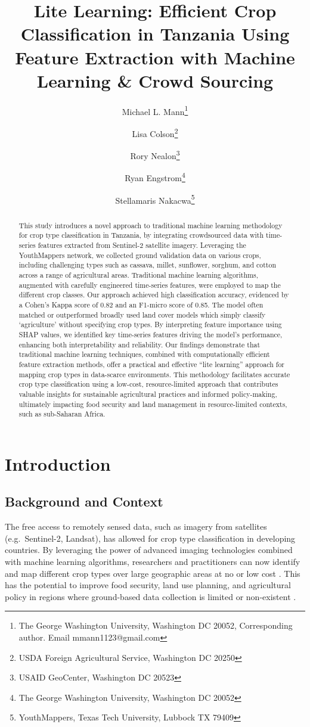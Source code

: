 \documentclass[
  journal,
  twocolumn]{IEEEtran}
\title{Lite Learning: Efficient Crop Classification in Tanzania Using
Feature Extraction with Machine Learning \& Crowd Sourcing}
\author{
Michael L. Mann\thanks{The George Washington University, Washington DC
20052, Corresponding author. Email mmann1123@gmail.com} \and 
Lisa Colson\thanks{USDA Foreign Agricultural Service, Washington DC
20250} \and 
Rory Nealon\thanks{USAID GeoCenter, Washington DC 20523} \and 
Ryan Engstrom\thanks{The George Washington University, Washington DC
20052} \and 
Stellamaris Nakacwa\thanks{YouthMappers, Texas Tech University, Lubbock
TX 79409}}
\date{}
\begin{document}
\maketitle
\begin{abstract}
This study introduces a novel approach to traditional machine learning
methodology for crop type classification in Tanzania, by integrating
crowdsourced data with time-series features extracted from Sentinel-2
satellite imagery. Leveraging the YouthMappers network, we collected
ground validation data on various crops, including challenging types
such as cassava, millet, sunflower, sorghum, and cotton across a range
of agricultural areas. Traditional machine learning algorithms,
augmented with carefully engineered time-series features, were employed
to map the different crop classes. Our approach achieved high
classification accuracy, evidenced by a Cohen's Kappa score of 0.82 and
an F1-micro score of 0.85. The model often matched or outperformed
broadly used land cover models which simply classify `agriculture'
without specifying crop types. By interpreting feature importance using
SHAP values, we identified key time-series features driving the model's
performance, enhancing both interpretability and reliability. Our
findings demonstrate that traditional machine learning techniques,
combined with computationally efficient feature extraction methods,
offer a practical and effective ``lite learning'' approach for mapping
crop types in data-scarce environments. This methodology facilitates
accurate crop type classification using a low-cost, resource-limited
approach that contributes valuable insights for sustainable agricultural
practices and informed policy-making, ultimately impacting food security
and land management in resource-limited contexts, such as sub-Saharan
Africa.
\end{abstract}

\section{Introduction}\label{introduction}

\subsection{Background and Context}\label{background-and-context}

The free access to remotely sensed data, such as imagery from satellites
(e.g.~Sentinel-2, Landsat), has allowed for crop type classification in
developing countries. By leveraging the power of advanced imaging
technologies combined with machine learning algorithms, researchers and
practitioners can now identify and map different crop types over large
geographic areas at no or low cost \citep{hersh2021open}. This has the
potential to improve food security, land use planning, and agricultural
policy in regions where ground-based data collection is limited or
non-existent \citep{begue2018remote, li2023development, ibrahim2021mapping}.
\end{document}
